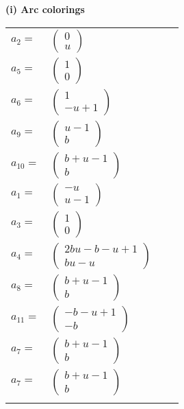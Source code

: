 \documentclass[1p]{elsarticle_modified}
\theoremstyle{definition}
\begin{document}
\flushleft \textbf{(i) Arc colorings}\\
\begin{tabular}{m{7pt} m{180pt} m{7pt} m{180pt} }
\flushright $a_{2}=$&$\begin{pmatrix}0\\u\end{pmatrix}$ \\
\flushright $a_{5}=$&$\begin{pmatrix}1\\0\end{pmatrix}$ \\
\flushright $a_{6}=$&$\begin{pmatrix}1\\- u+1\end{pmatrix}$ \\
\flushright $a_{9}=$&$\begin{pmatrix}u-1\\b\end{pmatrix}$ \\
\flushright $a_{10}=$&$\begin{pmatrix}b+u-1\\b\end{pmatrix}$ \\
\flushright $a_{1}=$&$\begin{pmatrix}- u\\u-1\end{pmatrix}$ \\
\flushright $a_{3}=$&$\begin{pmatrix}1\\0\end{pmatrix}$ \\
\flushright $a_{4}=$&$\begin{pmatrix}2 b u- b- u+1\\b u- u\end{pmatrix}$ \\
\flushright $a_{8}=$&$\begin{pmatrix}b+u-1\\b\end{pmatrix}$ \\
\flushright $a_{11}=$&$\begin{pmatrix}- b- u+1\\- b\end{pmatrix}$ \\
\flushright $a_{7}=$&$\begin{pmatrix}b+u-1\\b\end{pmatrix}$\\ \flushright $a_{7}=$&$\begin{pmatrix}b+u-1\\b\end{pmatrix}$\\&\end{tabular}
\end{document}
